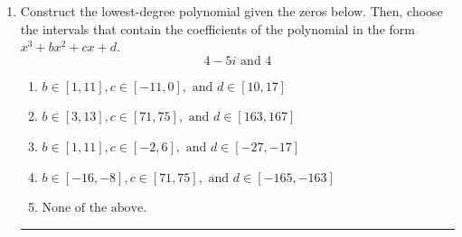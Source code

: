 \documentclass[14pt]{extbook}
\newcommand{\litem}[1]{\item#1\hspace*{-1cm}\rule{\textwidth}{0.4pt}}
\begin{document}
\begin{enumerate}
{\begin{enumerate}[label=\Alph*.]
\end{enumerate} }
\litem{
Construct the lowest-degree polynomial given the zeros below. Then, choose the intervals that contain the coefficients of the polynomial in the form $x^3+bx^2+cx+d$.\[ 4 - 5 i \text{ and } 4 \]\begin{enumerate}[label=\Alph*.]
\item \( b \in [1, 11], c \in [-11, 0], \text{ and } d \in [10, 17] \)
\item \( b \in [3, 13], c \in [71, 75], \text{ and } d \in [163, 167] \)
\item \( b \in [1, 11], c \in [-2, 6], \text{ and } d \in [-27, -17] \)
\item \( b \in [-16, -8], c \in [71, 75], \text{ and } d \in [-165, -163] \)
\item \( \text{None of the above.} \)


\end{enumerate}}
\end{enumerate}
\end{document}
